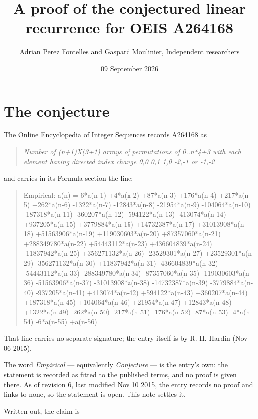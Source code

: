 \documentclass[11pt]{article}
\title{A proof of the conjectured linear recurrence for OEIS A264168}
\author{Adrian Perez Fontelles and Gaspard Moulinier, Independent researchers}
\date{09 September 2026}
\theoremstyle{definition}
\begin{document}
\maketitle
\section{The conjecture}

The Online Encyclopedia of Integer Sequences records \href{https://oeis.org/A264168}{A264168} as

\begin{quote}\itshape Number of (n+1)X(3+1) arrays of permutations of 0..n*4+3 with each element having directed index change 0,0 0,1 1,0 -2,-1 or -1,-2\end{quote}

and carries in its Formula section the line:

\begin{quote}\ttfamily Empirical: a(n) = 6*a(n-1) +4*a(n-2) +87*a(n-3) +176*a(n-4) +217*a(n-5) +262*a(n-6) -1322*a(n-7) -12843*a(n-8) -21954*a(n-9) -104064*a(n-10) -187318*a(n-11) -360207*a(n-12) -594122*a(n-13) -413074*a(n-14) +937205*a(n-15) +3779884*a(n-16) +14732387*a(n-17) +31013908*a(n-18) +51563906*a(n-19) +119030603*a(n-20) +87357060*a(n-21) +288349780*a(n-22) +54443112*a(n-23) +436604839*a(n-24) -11837942*a(n-25) +356271132*a(n-26) -23529301*a(n-27) +23529301*a(n-29) -356271132*a(n-30) +11837942*a(n-31) -436604839*a(n-32) -54443112*a(n-33) -288349780*a(n-34) -87357060*a(n-35) -119030603*a(n-36) -51563906*a(n-37) -31013908*a(n-38) -14732387*a(n-39) -3779884*a(n-40) -937205*a(n-41) +413074*a(n-42) +594122*a(n-43) +360207*a(n-44) +187318*a(n-45) +104064*a(n-46) +21954*a(n-47) +12843*a(n-48) +1322*a(n-49) -262*a(n-50) -217*a(n-51) -176*a(n-52) -87*a(n-53) -4*a(n-54) -6*a(n-55) +a(n-56)\end{quote}

That line carries no separate signature; the entry itself is by R. H. Hardin (Nov 06 2015).

The word {\itshape Empirical} --- equivalently {\itshape Conjecture} --- is the entry's own: the statement is recorded as fitted to the published terms, and no proof is given there. As of revision 6, last modified Nov 10 2015, the entry records no proof and links to none, so the statement is open. This note settles it.

Written out, the claim is
\end{document}
